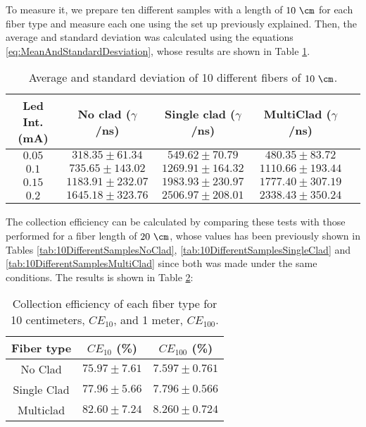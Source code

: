 To measure it, we prepare ten different samples with a length of $10~\cm$ for each fiber type and measure each one using the set up previously explained. Then, the average and standard deviation was calculated using the equations \ref{eq:MeanAndStandardDesviation}, whose results are shown in Table \ref{tab:10DifferentSamplesAlltypes}.

\begin{table}[htbp]
\begin{center}
\begin{tabular}{|c|c|c|c|c|}
\hline
Led Int. (mA) & No clad ($\gamma$/ns) & Single clad ($\gamma$/ns) & MultiClad ($\gamma$/ns) \\
\hline \hline \hline
$0.05$ & $318.35 \pm 61.34$ & $549.62 \pm 70.79$ & $480.35 \pm 83.72$ \\ \hline
$0.1$ & $735.65 \pm 143.02$ & $1269.91 \pm 164.32$ & $1110.66 \pm 193.44$ \\ \hline
$0.15$ & $1183.91 \pm 232.07$ & $1983.93 \pm 230.97$ & $1777.40\pm 307.19$ \\ \hline
$0.2$ & $1645.18 \pm 323.76$ & $2506.97 \pm 208.01$ & $2338.43 \pm 350.24$ \\ \hline
\end{tabular}
\caption{Average and standard deviation of 10 different fibers of $10~\cm$.}
\label{tab:10DifferentSamplesAlltypes}
\end{center}
\end{table}

The collection efficiency can be calculated by comparing these tests with those performed for a fiber length of $20~\cm$, whose values has been previously shown in Tables \ref{tab:10DifferentSamplesNoClad}, \ref{tab:10DifferentSamplesSingleClad} and \ref{tab:10DifferentSamplesMultiClad} since both was made under the same conditions. The results is shown in Table \ref{tab:CollectionEfficiencyOfFibers}:



\begin{table}[htbp]
\begin{center}
\begin{tabular}{|c|c|c|}
\hline
Fiber type & $CE_{10}$ (\%) & $CE_{100}$ (\%) \\\hline \hline \hline
No Clad & $75.97 \pm 7.61$ & $7.597 \pm 0.761$ \\ \hline
Single Clad & $77.96 \pm 5.66$ & $7.796 \pm 0.566$ \\ \hline
Multiclad & $82.60 \pm 7.24$ & $8.260 \pm 0.724$ \\ \hline
\end{tabular}
\caption{Collection efficiency of each fiber type for 10 centimeters, $CE_{10}$, and 1 meter, $CE_{100}$.}
\label{tab:CollectionEfficiencyOfFibers}
\end{center}
\end{table}

